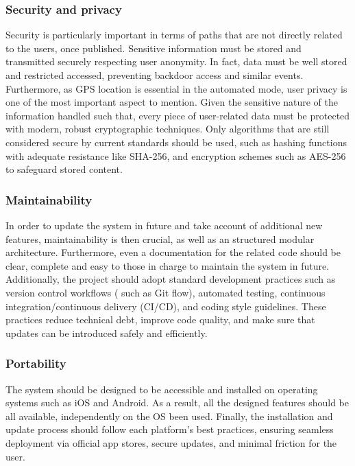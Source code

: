 \subsubsection{Security and privacy}
 Security is particularly important in terms of paths that are not directly related to the users, once published. Sensitive information must be stored and transmitted securely respecting user anonymity. In fact, data must be well stored and restricted accessed, preventing backdoor access and similar events. Furthermore, as GPS location is essential in the automated mode, user privacy is one of the most important aspect to mention. Given the sensitive nature of the information handled such that, every piece of user-related data must be protected with modern, robust cryptographic techniques. Only algorithms that are still considered secure by current standards should be used, such as hashing functions with adequate resistance like SHA-256, and encryption schemes such as AES-256 to safeguard stored content. 
 \subsubsection{Maintainability}
 In order to update the system in future and take account of additional new features, maintainability is then crucial, as well as an structured modular architecture. Furthermore, even a documentation for the related code should be clear, complete and easy to those in charge to maintain the system in future. Additionally, the project should adopt standard development practices such as version control workflows ( such as Git flow), automated testing, continuous integration/continuous delivery (CI/CD), and coding style guidelines. These practices reduce technical debt, improve code quality, and make sure that updates can be introduced safely and efficiently.
 \subsubsection{Portability}
 The system should be designed to be accessible and installed on operating systems such as iOS and Android. As a result, all the designed features should be all available, independently on the OS been used. Finally, the installation and update process should follow each platform’s best practices, ensuring seamless deployment via official app stores, secure updates, and minimal friction for the user.

